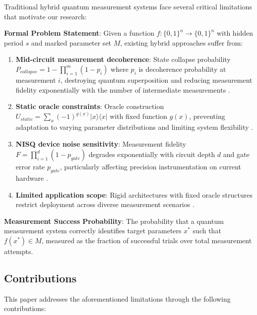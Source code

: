 \documentclass[journal]{IEEEtran}
\begin{document}
{Traditional hybrid quantum measurement systems face several critical limitations that motivate our research:

\textbf{Formal Problem Statement}: Given a function $f: \{0,1\}^n \rightarrow \{0,1\}^n$ with hidden period $s$ and marked parameter set $M$, existing hybrid approaches suffer from:

\begin{enumerate}
\item \textbf{Mid-circuit measurement decoherence}: State collapse probability $P_{collapse} = 1 - \prod_{i=1}^m (1-p_i)$ where $p_i$ is decoherence probability at measurement $i$, destroying quantum superposition and reducing measurement fidelity exponentially with the number of intermediate measurements \cite{Bharti_2022, 9142431}.

\item \textbf{Static oracle constraints}: Oracle construction $U_{static} = \sum_{x} (-1)^{g(x)} |x\rangle\langle x|$ with fixed function $g(x)$, preventing adaptation to varying parameter distributions and limiting system flexibility \cite{Bharti_2022}.

\item \textbf{NISQ device noise sensitivity}: Measurement fidelity $F = \prod_{i=1}^{d} (1-p_{gate})$ degrades exponentially with circuit depth $d$ and gate error rate $p_{gate}$, particularly affecting precision instrumentation on current hardware \cite{Arute_2019, Bharti_2022}.

\item \textbf{Limited application scope}: Rigid architectures with fixed oracle structures restrict deployment across diverse measurement scenarios \cite{10041809, AbuGhanem:2024vwb}.
\end{enumerate}}

\textbf{Measurement Success Probability}: The probability that a quantum measurement system correctly identifies target parameters $x^*$ such that $f(x^*) \in M$, measured as the fraction of successful trials over total measurement attempts.

\subsection{Contributions}

This paper addresses the aforementioned limitations through the following contributions:
\end{document}
